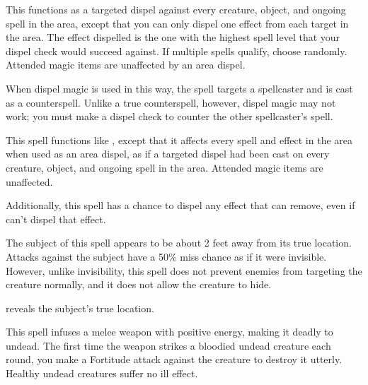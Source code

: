 \begin{spelleffect}
  \par This functions as a targeted dispel against every creature, object, and ongoing spell in the area, except that you can only dispel one effect from each target in the area. The effect dispelled is the one with the highest spell level that your dispel check would succeed against. If multiple spells qualify, choose randomly. Attended magic items are unaffected by an area dispel.

  \par {} When dispel magic is used in this way, the spell targets a spellcaster and is cast as a counterspell. Unlike a true counterspell, however, dispel magic may not work; you must make a dispel check to counter the other spellcaster's spell.
\end{spelleffect}

\begin{spelleffect}
  This spell functions like , except that it affects every spell and effect in the area when used as an area dispel, as if a targeted dispel had been cast on every creature, object, and ongoing spell in the area. Attended magic items are unaffected.
  \par Additionally, this spell has a chance to dispel any effect that  can remove, even if  can't dispel that effect.
\end{spelleffect}

\spellrng{\rngclose}
\begin{spelleffect}
  The subject of this spell appears to be about 2 feet away from its true location. Attacks against the subject have a 50\% miss chance as if it were invisible. However, unlike invisibility, this spell does not prevent enemies from targeting the creature normally, and it does not allow the creature to hide.
\end{spelleffect}
\begin{spellnotes}
     reveals the subject's true location.
\end{spellnotes}

\spellrng{\rngclose}
\spelldur{\durshort}
\begin{spelleffect}
  This spell infuses a melee weapon with positive energy, making it deadly to undead. The first time the weapon strikes a bloodied undead creature each round, you make a Fortitude attack against the creature to destroy it utterly. Healthy undead creatures suffer no ill effect.
\end{spelleffect}

